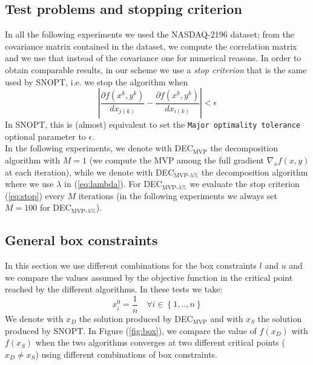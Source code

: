 \subsection{Test problems and stopping criterion}
In all the following experiments we used the NASDAQ-2196 dataset; from the covariance matrix contained in the dataset, we compute the correlation matrix and we use that instead of the covariance one for numerical reasons.
In order to obtain comparable results, in our scheme we use a \textit{stop criterion} that is the same used by SNOPT, i.e. we stop the algorithm when
\begin{equation}\label{eq:stop}
\left| \frac{\partial f(x^k,y^k)}{d{x_{j(k)}}} - \frac{\partial f(x^k,y^k)}{d{x_{i(k)}} }\right| < \epsilon
\end{equation}
In SNOPT, this is (almost) equivalent to set the \texttt{Major optimality tolerance} optional parameter to $\epsilon$.\\
In the following experiments, we denote with DEC$_{\text{MVP}}$ the decomposition algorithm with $M=1$ (we compute the MVP among the full gradient $\nabla_x f(x,y)$ at each iteration), while we denote with DEC$_{\text{MVP-}\lambda\%}$ the decomposition algorithm where we use $\lambda$ in (\ref{eq:lambda}). For DEC$_{\text{MVP-}\lambda\%}$ we evaluate the stop criterion (\ref{eq:stop}) every $M$ iterations (in the following experiments we always set $M=100$ for DEC$_{\text{MVP-}\lambda\%}$).

\subsection{General box constraints}
In this section we use different combinations for the box constraints $l$ and $u$ and we compare the values assumed by the objective function in the critical point reached by the different algorithms. In these tests we take:
\begin{equation}
x_i^0 = \frac{1}{n} \quad \forall i \in \left\{1, .., n \right\}
\end{equation}
We denote with $x_{D}$ the solution produced by DEC$_{\text{MVP}}$ and with $x_{S}$ the solution produced by SNOPT. In Figure (\ref{fig:box}), we compare the value of $f(x_{D})$ with $f(x_{S})$ when the two algorithms converges at two different critical points ($x_D \neq x_S$) using different combinations of box constraints.

